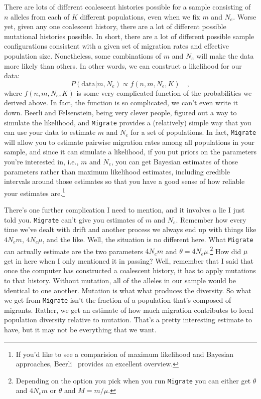 There are lots of different coalescent histories possible for a sample
consisting of $n$ alleles from each of $K$ different populations, even
when we fix $m$ and $N_e$. Worse yet, given any one coalescent
history, there are a lot of different possible mutational histories
possible. In short, there are a lot of different possible sample
configurations consistent with a given set of migration rates and
effective population size. Nonetheless, some combinations of $m$ and
$N_e$ will make the data more likely than others. In other words, we
can construct a likelihood for our data:
\[
P(\mbox{data}|m, N_e) \propto f(n, m, N_e, K) \quad ,
\]
where $f(n, m, N_e,K)$ is some very complicated function of the
probabilities we derived above. In fact, the function is so
complicated, we can't even write it down. Beerli and Felsenstein,
being very clever people, figured out a way to simulate the
likelihood, and {\tt Migrate} provides a (relatively) simple way that
you can use your data to estimate $m$ and $N_e$ for a set of
populations. In fact, {\tt Migrate} will allow you to estimate
pairwise migration rates among all populations in your sample, and
since it can simulate a likelihood, if you put priors on the
parameters you're interested in, i.e., $m$ and $N_e$, you can get
Bayesian estimates of those parameters rather than maximum likelihood
estimates, including credible intervals around those estimates so that
you have a good sense of how reliable your estimates are.\footnote{If
  you'd like to see a comparision of maximum likelihood and Bayesian
  approaches, Beerli~\cite{Beerli-2006} provides an excellent
  overview.}

There's one further complication I need to mention, and it involves a
lie I just told you. {\tt Migrate} can't give you estimates of $m$ and
$N_e$. Remember how every time we've dealt with drift and another
process we always end up with things like $4N_em$, $4N_e\mu$, and the
like. Well, the situation is no different here. What {\tt Migrate} can
actually estimate are the two parameters $4N_em$ and
$\theta=4N_e\mu$.\footnote{Depending on the option you pick when you
  run {\tt Migrate} you can either get $\theta$ and $4N_em$ or
  $\theta$ and $M=m/\mu$.} How did $\mu$ get in here when I only
mentioned it in passing? Well, remember that I said that once the
computer has constructed a coalescent history, it has to apply
mutations to that history. Without mutation, all of the alleles in our
sample would be identical to one another. Mutation is what what
produces the diversity. So what we get from {\tt Migrate} isn't the
fraction of a population that's composed of migrants. Rather, we get
an estimate of how much migration contributes to local population
diversity relative to mutation. That's a pretty interesting estimate
to have, but it may not be everything that we want.


